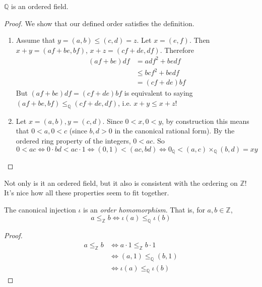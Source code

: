 \documentclass{article}
\begin{document}
      \begin{theorem}
        $\mathbb{Q}$ is an ordered field. 
      \end{theorem} 
      \begin{proof}
        We show that our defined order satisfies the definition. 
        \begin{enumerate}
          \item Assume that $y = (a, b) \leq (c, d) = z$. Let $x = (e, f)$. Then $x + y = (af + be, bf)$, $x + z = (cf + de, df)$. Therefore 
          \begin{align}
            (af + be) df & = adf^2 + bedf \\ 
                         & \leq bcf^2 + bedf \\
                         & = (cf + de) bf
          \end{align} 
          But $(af + be) df = (cf + de) bf$ is equivalent to saying $(af + be, bf) \leq_{\mathbb{Q}} (cf + de, df)$, i.e. $x + y \leq x + z$!  

          \item Let $x = (a, b), y = (c, d)$. Since $0 < x, 0 < y$, by construction this means that $0 < a, 0 < c$ (since $b, d > 0$ in the canonical rational form). By the ordered ring property of the integers, $0 < ac$. So 
          \begin{equation}
            0 < ac \iff 0 \cdot bd < ac \cdot 1 \iff (0, 1) < (ac, bd)  \iff 0_{\mathbb{Q}} < (a, c) \times_{\mathbb{Q}} (b, d) = x y
          \end{equation}
        \end{enumerate}
      \end{proof} 

      Not only is it an ordered field, but it also is consistent with the ordering on $\mathbb{Z}$! It's nice how all these properties seem to fit together. 

      \begin{theorem}
        The canonical injection $\iota$ is an \textit{order homomorphism}. That is, for $a, b \in \mathbb{Z}$, 
        \begin{equation}
          a \leq_{\mathbb{Z}} b \iff \iota(a) \leq_{\mathbb{Q}} \iota(b)
        \end{equation}
      \end{theorem}
      \begin{proof} 
        \begin{align}
          a \leq_{\mathbb{Z}} b & \iff a \cdot 1 \leq_{\mathbb{Z}} b \cdot 1 \\
                                & \iff (a, 1) \leq_{\mathbb{Q}} (b, 1) \\
                                & \iff \iota(a) \leq_{\mathbb{Q}} \iota(b)
        \end{align}
      \end{proof}
\end{document}
